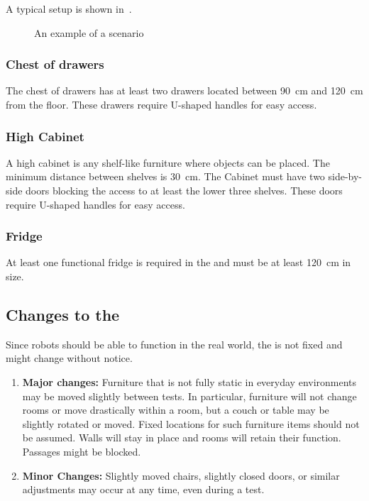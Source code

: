 A typical \Arena{} setup is shown in~.
\begin{figure}[tbp]
	\centering
	\caption{An example of a \RoboCup\AtHome{} scenario}\label{fig:arena}
\end{figure}

\subsubsection{Chest of drawers}

The chest of drawers has at least two drawers located between \SI{90}{\centi\meter} and \SI{120}{\centi\meter} from the floor. These drawers require U-shaped handles for easy access.

\subsubsection{High Cabinet}

A high cabinet is any shelf-like furniture where objects can be placed. The minimum distance between shelves is \SI{30}{\centi\meter}.
The Cabinet must have two side-by-side doors blocking the access to at least the lower three shelves.
These doors require U-shaped handles for easy access.

\subsubsection{Fridge}

At least one functional fridge is required in the \Arena{} and must be at least \SI{120}{\centi\meter} in size.

\subsection{Changes to the \Arena}\label{rule:scenario_changes}

Since robots should be able to function in the real world, the \Arena{} is not fixed and might change without notice.
\begin{enumerate}
	\item \textbf{Major changes:}
	Furniture that is not fully static in everyday environments may be moved slightly between tests.
	In particular, furniture will not change rooms or move drastically within a room, but a couch or table may be slightly rotated or moved. Fixed locations for such furniture items should not be assumed.
	Walls will stay in place and rooms will retain their function.
	Passages might be blocked.
	\item \textbf{Minor Changes:} Slightly moved chairs, slightly closed doors, or similar adjustments may occur at any time, even during a test.
\end{enumerate}

